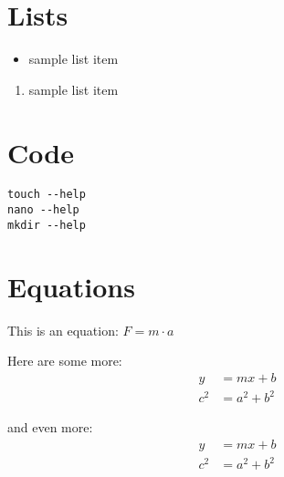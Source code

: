 

\section{Lists}
\begin{itemize}
	\item sample list item
\end{itemize}

\begin{enumerate}
	\item sample list item
\end{enumerate}

\section{Code}
\begin{lstlisting}
touch --help
nano --help
mkdir --help
\end{lstlisting}




\section{Equations}
This is an equation: $F = m \cdot a$

Here are some more:
\begin{align}
	y &= mx + b \\
	c^2 &= a^2 + b^2
\end{align}

and even more:
\begin{align*}
	y &= mx + b \\
	c^2 &= a^2 + b^2
\end{align*}

